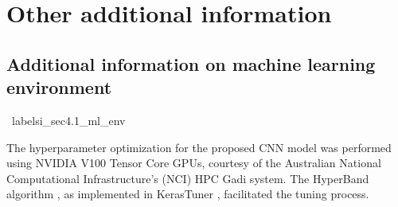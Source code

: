 

\section{Other additional information}
\label{si_sec4_env}


\subsection{Additional information on machine learning environment}  \
label{si_sec4.1_ml_env}

The hyperparameter optimization for the proposed CNN model was performed using NVIDIA\textsuperscript{\textregistered} V100 Tensor Core GPUs,
courtesy of the Australian National Computational Infrastructure's (NCI) HPC Gadi system.
The HyperBand algorithm \cite{li2018hyperband}, as implemented in KerasTuner \cite{omalley2019kerastuner} , facilitated the tuning process.

